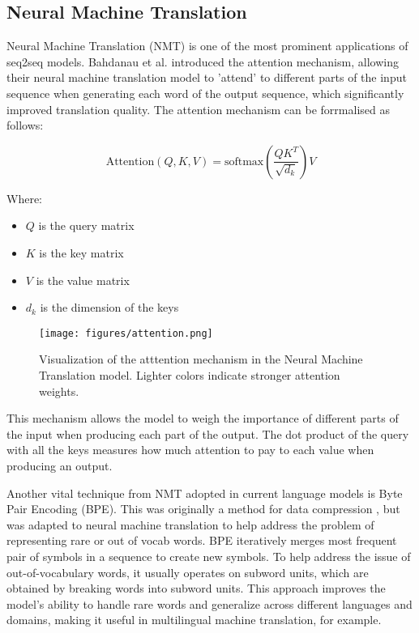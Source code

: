 \documentclass[a4paper, oneside]{discothesis}
\begin{document}
\subsection{Neural Machine Translation}
Neural Machine Translation (NMT) is one of the most prominent applications of seq2seq models.
Bahdanau et al. \cite{bahdanau2014neural} introduced the attention mechanism, allowing their neural machine translation model to 'attend' to different parts of the input sequence when generating each word of the output sequence, which significantly improved translation quality.
The attention mechanism can be forrmalised as follows:

\begin{equation}
\text{Attention}(Q, K, V) = \text{softmax}\left(\frac{QK^T}{\sqrt{d_k}}\right)V
\end{equation}

Where:
\begin{itemize}
    \item $Q$ is the query matrix
    \item $K$ is the key matrix
    \item $V$ is the value matrix
    \item $d_k$ is the dimension of the keys
\end{itemize}

\begin{figure}[h]
    \centering
    \texttt{[image: figures/attention.png]}
    \caption{Visualization of the atttention mechanism in the Neural Machine Translation model. Lighter colors indicate stronger attention weights.}
    \label{fig:nmt_self_attention}
\end{figure}

This mechanism allows the model to weigh the importance of different parts of the input when producing each part of the output. The dot product of the query with all the keys measures how much attention to pay to each value when producing an output.

Another vital technique from NMT adopted in current language models is Byte Pair Encoding (BPE). This was originally a method for data compression \cite{gage}, but was adapted to neural machine translation to help address the problem of representing rare or out of vocab words\cite{sennrich2015neural}. BPE iteratively merges most frequent pair of symbols in a sequence to create new symbols. To help address the issue of out-of-vocabulary words, it usually operates on subword units, which are obtained by breaking words into subword units. This approach improves the model's ability to handle rare words and generalize across different languages and domains, making it useful in multilingual machine translation, for example.
\end{document}
